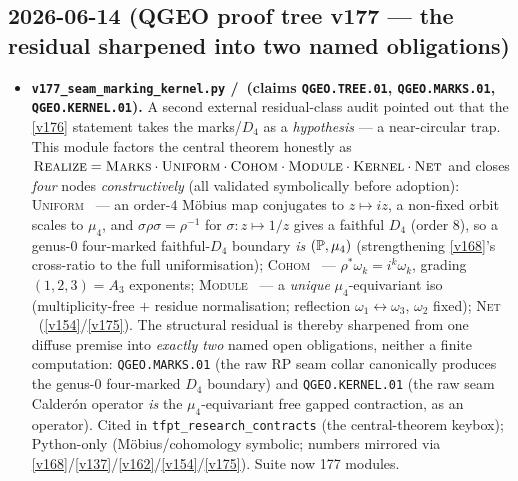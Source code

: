 \subsection*{2026-06-14 (QGEO proof tree v177 --- the residual sharpened into two named obligations)}
\begin{itemize}
\item \textbf{\texttt{v177\_seam\_marking\_kernel.py} \mE/\mO\ (claims \texttt{QGEO.TREE.01},
  \texttt{QGEO.MARKS.01}, \texttt{QGEO.KERNEL.01}).} A second external residual-class audit pointed
  out that the \vref{v176} statement takes the marks/$D_4$ as a \emph{hypothesis} --- a near-circular
  trap. This module factors the central theorem honestly as
  $\textsc{Realize}=\textsc{Marks}\cdot\textsc{Uniform}\cdot\textsc{Cohom}\cdot\textsc{Module}\cdot
  \textsc{Kernel}\cdot\textsc{Net}$ and closes \emph{four} nodes \emph{constructively} (all validated
  symbolically before adoption): \textsc{Uniform} \mE\ --- an order-$4$ M\"obius map conjugates to
  $z\mapsto iz$, a non-fixed orbit scales to $\mu_4$, and $\sigma\rho\sigma=\rho^{-1}$ for
  $\sigma:z\mapsto1/z$ gives a faithful $D_4$ (order $8$), so a genus-$0$ four-marked faithful-$D_4$
  boundary \emph{is} $(\mathbb{P},\mu_4)$ (strengthening \vref{v168}'s cross-ratio to the full
  uniformisation); \textsc{Cohom} \mE\ --- $\rho^*\omega_k=i^k\omega_k$, grading $(1,2,3)=A_3$
  exponents; \textsc{Module} \mE\ --- a \emph{unique} $\mu_4$-equivariant iso (multiplicity-free $+$
  residue normalisation; reflection $\omega_1\!\leftrightarrow\!\omega_3$, $\omega_2$ fixed);
  \textsc{Net} \mE\ (\vref{v154}/\vref{v175}). The structural residual is thereby sharpened from one
  diffuse premise into \emph{exactly two} named open obligations, neither a finite computation:
  \texttt{QGEO.MARKS.01} (the raw RP seam collar canonically produces the genus-$0$ four-marked $D_4$
  boundary) and \texttt{QGEO.KERNEL.01} (the raw seam Calder\'on operator \emph{is} the
  $\mu_4$-equivariant free gapped contraction, as an operator). Cited in
  \texttt{tfpt\_research\_contracts} (the central-theorem keybox); Python-only (M\"obius/cohomology
  symbolic; numbers mirrored via \vref{v168}/\vref{v137}/\vref{v162}/\vref{v154}/\vref{v175}). Suite
  now 177 modules.
\end{itemize}

